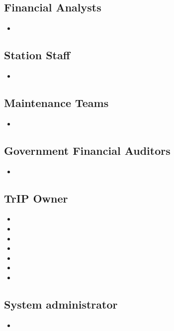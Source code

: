 \subsection{Financial Analysts}
\begin{itemize}
    \item \userStoryTwentyFive
\end{itemize}

\subsection{Station Staff}
\begin{itemize}
    \item \userStoryTwentySix
\end{itemize}

\subsection{Maintenance Teams}
\begin{itemize}
    \item \userStoryTwentySeven
\end{itemize}

\subsection{Government Financial Auditors}
\begin{itemize}
    \item \userStoryTwentyEight
\end{itemize}

\subsection{TrIP Owner}
\begin{itemize}
    \item \userStoryFortyOne
    \item \userStoryTwentyNine
    \item \userStoryThirty
    \item \userStoryThirtyOne
    \item \userStoryThirtyTwo
    \item \userStoryThirtyThree
    \item \userStoryThirtyFour
\end{itemize}

\subsection{System administrator}
\begin{itemize}
    \item \userStoryThirtySix
\end{itemize}
